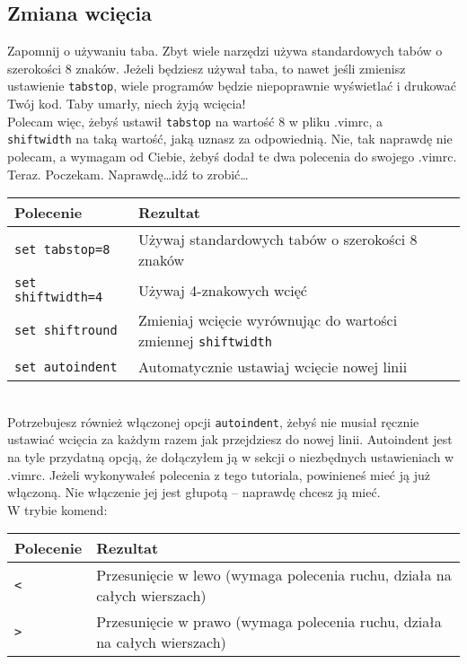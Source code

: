 \documentclass[a4paper,12pt]{article}
\begin{document}
\subsection{Zmiana wcięcia}
Zapomnij o używaniu taba. Zbyt wiele narzędzi używa standardowych tabów o szerokości 8 znaków. Jeżeli będziesz używał taba, to nawet jeśli zmienisz ustawienie {\tt tabstop}, wiele programów będzie niepoprawnie wyświetlać i drukować Twój kod. Taby umarły, niech żyją wcięcia!\\
Polecam więc, żebyś ustawił {\tt tabstop} na wartość 8 w pliku .vimrc, a\\ {\tt shiftwidth} na taką wartość, jaką uznasz za odpowiednią. Nie, tak naprawdę nie polecam, a wymagam od Ciebie, żebyś dodał te dwa polecenia do swojego .vimrc. Teraz. Poczekam. Naprawdę\ldots idź to zrobić\ldots

\begin{tabular}{ l | p{} }
{\bf Polecenie} & {\bf Rezultat} \\ \hline
{\tt set tabstop=8} & Używaj standardowych tabów o szerokości 8 znaków \\
{\tt set shiftwidth=4} & Używaj 4-znakowych wcięć \\
{\tt set shiftround} & Zmieniaj wcięcie wyrównując do wartości zmiennej {\tt shiftwidth} \\
{\tt set autoindent} & Automatycznie ustawiaj wcięcie nowej linii \\ \hline
\end{tabular}\\

\noindent
Potrzebujesz również włączonej opcji {\tt autoindent}, żebyś nie musiał ręcznie ustawiać wcięcia za każdym razem jak przejdziesz do nowej linii. Autoindent jest na tyle przydatną opcją, że dołączyłem ją w sekcji o niezbędnych ustawieniach w .vimrc. Jeżeli wykonywałeś polecenia z tego tutoriala, powinieneś mieć ją już włączoną. Nie włączenie jej jest głupotą -- naprawdę chcesz ją mieć.\\
W trybie komend:

\begin{tabular}{ l | p{} } 
{\bf Polecenie} & {\bf Rezultat} \\ \hline
{\tt <} & Przesunięcie w lewo (wymaga polecenia ruchu, działa na całych wierszach)\\
{\tt >} & Przesunięcie w prawo (wymaga polecenia ruchu, działa na całych wierszach) \\ \hline
\end{tabular}\\
\end{document}
